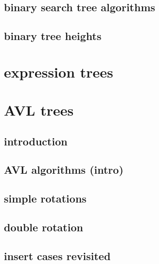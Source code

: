 \subsection{binary search tree algorithms}    
 

\subsection{binary tree heights}


\section{expression trees}


\section{AVL trees}


\subsection{introduction}


\subsection{AVL algorithms (intro)}





\subsection{simple rotations}


\subsection{double rotation}


\subsection{insert cases revisited}




